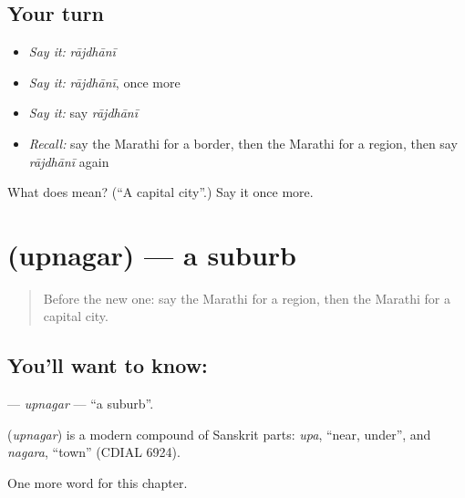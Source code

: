 \subsection*{Your turn}
\begin{itemize}
\raggedright
  \item \emph{Say it:} \emph{rājdhānī}
  \item \emph{Say it:} \emph{rājdhānī}, once more
  \item \emph{Say it:} say \emph{rājdhānī}
  \item \emph{Recall:} say the Marathi for a border, then the Marathi for a region, then say \emph{rājdhānī} again
\end{itemize}

\begin{tcolorbox}[breakable,colback=teal!4,colframe=teal!35!black,title={Before you move on}]
What does  mean? (\textquotedblleft{}A capital city\textquotedblright{}.) Say it once more.
\end{tcolorbox}
\section[\texorpdfstring{\mr{उपनगर} (upnagar)}{उपनगर (upnagar)}]{ (upnagar) — a suburb}

\label{lesson:MR-C202-upnagar}



\begin{quote}
Before the new one: say the Marathi for a region, then the Marathi for a capital city.
\end{quote}

\subsection*{You'll want to know: }
\textbf{} — \emph{upnagar} — \textquotedblleft{}a suburb\textquotedblright{}.

\begin{cousinweb}
\textbf{} (\emph{upnagar}) is a modern compound of Sanskrit parts: \emph{upa}, \textquotedblleft{}near, under\textquotedblright{}, and \emph{nagara}, \textquotedblleft{}town\textquotedblright{} (CDIAL 6924).
\end{cousinweb}

\begin{grammarlens}[title={What you've built}]
One more word for this chapter.
\end{grammarlens}

